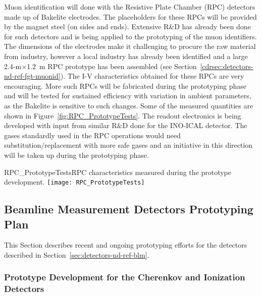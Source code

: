Muon identification will done with the Resistive Plate Chamber (RPC)
detectors made up of Bakelite electrodes.  The placeholders  for these
RPCs will be provided by the magnet steel (on sides and ends). %
Extensive R\&D has already been done for such detectors and 
is being applied 
to the prototyping of the
muon identifiers. The dimensions of the electrodes  
make it 
challenging to procure the raw material from industry, however a local 
industry has already been identified and a large 2.4-m$\times$1.2~m
RPC prototype has been assembled (see
Section~\ref{cdrsec:detectors-nd-ref-fgt-muonid}). The I-V
characteristics obtained for these RPCs are very encouraging. More such
RPCs will be fabricated during the prototyping phase and will be  
tested for sustained efficiency %
with variation
in ambient parameters, as the Bakelite is sensitive to such
changes. Some of the measured quantities are shown in
Figure~\ref{fig:RPC_PrototypeTests}.  The readout electronics is being
developed with input from similar R\&D done for the INO-ICAL
detector.  The gases standardly used in the RPC operations would need
substitution/replacement with more safe gases  and an initiative in
this direction will be taken up during the prototyping phase.
\begin{cdrfigure}
{RPC_PrototypeTests}{RPC characteristics measured during the prototype development.}
\texttt{[image: RPC\_PrototypeTests]}
\end{cdrfigure}



\subsection{Beamline Measurement Detectors Prototyping Plan}
\label{sec:proto-nd-blm}
This Section describes recent and ongoing prototyping efforts for the detectors described in Section~\ref{sec:detectors-nd-ref-blm}.


\subsubsection{Prototype Development for the Cherenkov and Ionization Detectors}
\label{subsec:proto-blm-muon-cherenkov-proto}

